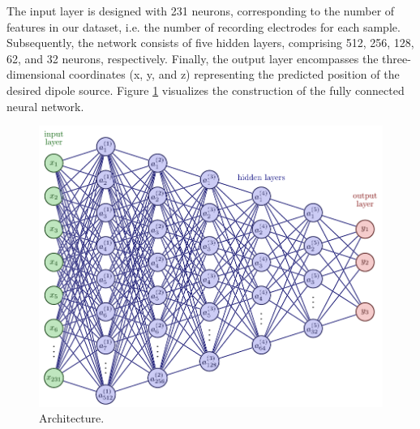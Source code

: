 \documentclass[a4paper, UKenglish, 11pt]{uiomaster}
\begin{document}
The input layer is designed with 231 neurons, corresponding to the number of features in our dataset, i.e. the number of recording electrodes for each sample. Subsequently, the network consists of five hidden layers, comprising 512, 256, 128, 62, and 32 neurons, respectively. Finally, the output layer encompasses the three-dimensional coordinates (x, y, and z) representing the predicted position of the desired dipole source. Figure \ref{fig:FFNN_architecture} visualizes the construction of the fully connected neural network.

\begin{figure}[!htb]
    \centering
    \includegraphics[width=\linewidth]{figures/FFNN_architecture.pdf}
    \caption{Architecture.}
    \label{fig:FFNN_architecture}
\end{figure}
\end{document}
